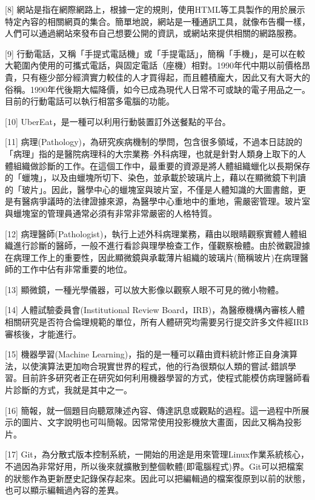 \documentclass[
]{article}
\begin{document}
{[}8{]}
網站是指在網際網路上，根據一定的規則，使用HTML等工具製作的用於展示特定內容的相關網頁的集合。簡單地說，網站是一種通訊工具，就像布告欄一樣，人們可以通過網站來發布自己想要公開的資訊，或網站來提供相關的網路服務。

{[}9{]}
行動電話，又稱「手提式電話機」或「手提電話」，簡稱「手機」，是可以在較大範圍內使用的可攜式電話，與固定電話（座機）相對。1990年代中期以前價格昂貴，只有極少部分經濟實力較佳的人才買得起，而且體積龐大，因此又有大哥大的俗稱。1990年代後期大幅降價，如今已成為現代人日常不可或缺的電子用品之一。目前的行動電話可以執行相當多電腦的功能。

{[}10{]} UberEat，是一種可以利用行動裝置訂外送餐點的平台。

{[}11{]}
病理(Pathology)，為研究疾病機制的學問，包含很多領域，不過本日誌說的「病理」指的是醫院病理科的大宗業務--外科病理，也就是針對人類身上取下的人體組織做診斷的工作。在這個工作中，最重要的資源是將人體組織蠟化以長期保存的「蠟塊」，以及由蠟塊所切下、染色，並承載於玻璃片上，藉以在顯微鏡下判讀的「玻片」。因此，醫學中心的蠟塊室與玻片室，不僅是人體知識的大圖書館，更是有醫病爭議時的法律證據來源，為醫學中心重地中的重地，需嚴密管理。玻片室與蠟塊室的管理員通常必須有非常非常嚴密的人格特質。

{[}12{]}
病理醫師(Pathologist)，執行上述外科病理業務，藉由以眼睛觀察實體人體組織進行診斷的醫師，一般不進行看診與理學檢查工作，僅觀察檢體。由於微觀證據在病理工作上的重要性，因此顯微鏡與承載薄片組織的玻璃片(簡稱玻片)在病理醫師的工作中佔有非常重要的地位。

{[}13{]} 顯微鏡，一種光學儀器，可以放大影像以觀察人眼不可見的微小物體。

{[}14{]} 人體試驗委員會(Institutional Review
Board，IRB)，為醫療機構內審核人體相關研究是否符合倫理規範的單位，所有人體研究均需要另行提交許多文件經IRB審核後，才能進行。

{[}15{]} 機器學習(Machine
Learning)，指的是一種可以藉由資料統計修正自身演算法，以使演算法更加吻合現實世界的程式，他的行為很類似人類的嘗試-錯誤學習。目前許多研究者正在研究如何利用機器學習的方式，使程式能模仿病理醫師看片診斷的方式，我就是其中之一。

{[}16{]}
簡報，就一個題目向聽眾陳述內容、傳達訊息或觀點的過程。這一過程中所展示的圖片、文字說明也可叫簡報。因常常使用投影機放大畫面，因此又稱為投影片。

{[}17{]}
Git，為分散式版本控制系統，一開始的用途是用來管理Linux作業系統核心，不過因為非常好用，所以後來就擴散到整個軟體(即電腦程式)界。Git可以把檔案的狀態作為更新歷史記錄保存起來。因此可以把編輯過的檔案復原到以前的狀態，也可以顯示編輯過內容的差異。
\end{document}
